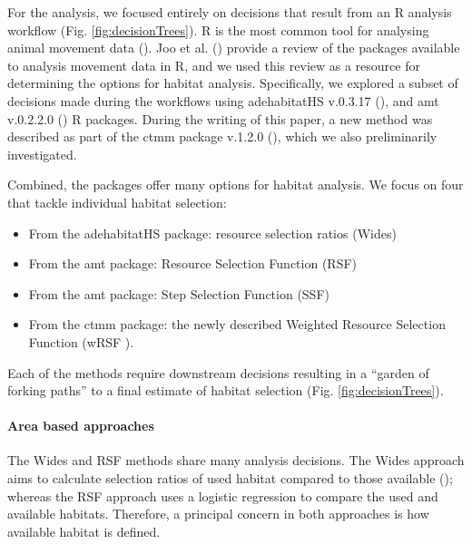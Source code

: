 \documentclass[10pt,a4paper]{article}
\begin{document}
For the analysis, we focused entirely on decisions that result from an R analysis workflow (Fig. \ref{fig:decisionTrees}).
R is the most common tool for analysing animal movement data ().
Joo et al. () provide a review of the packages available to analysis movement data in R, and we used this review as a resource for determining the options for habitat analysis.
Specifically, we explored a subset of decisions made during the workflows using adehabitatHS v.0.3.17 (), and amt v.0.2.2.0 () R packages.
During the writing of this paper, a new method was described as part of the ctmm package v.1.2.0 (), which we also preliminarily investigated.

Combined, the packages offer many options for habitat analysis.
We focus on four that tackle individual habitat selection:

\begin{itemize}
\item
  From the adehabitatHS package: resource selection ratios (Wides)
\item
  From the amt package: Resource Selection Function (RSF)
\item
  From the amt package: Step Selection Function (SSF)
\item
  From the ctmm package: the newly described Weighted Resource Selection Function (wRSF ).
\end{itemize}

Each of the methods require downstream decisions resulting in a ``garden of forking paths'' to a final estimate of habitat selection (Fig. \ref{fig:decisionTrees}).

\paragraph{Area based approaches}\label{area-based-approaches}

The Wides and RSF methods share many analysis decisions.
The Wides approach aims to calculate selection ratios of used habitat compared to those available (); whereas the RSF approach uses a logistic regression to compare the used and available habitats.
Therefore, a principal concern in both approaches is how available habitat is defined.
\end{document}
